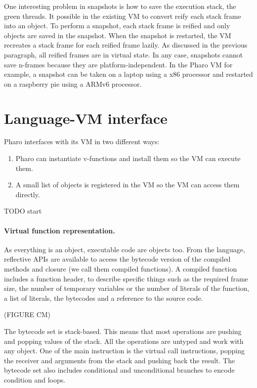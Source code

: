 \documentclass[a4paper,12pt,twoside]{../includes/ThesisStyle}
\begin{document}
One interesting problem in snapshots is how to save the execution stack, \ie the green threads. It possible in the existing VM to convert reify each stack frame into an object. To perform a snapshot, each stack frame is reified and only objects are saved in the snapshot. When the snapshot is restarted, the VM recreates a stack frame for each reified frame lazily. As discussed in the previous paragraph, all reified frames are in virtual state. In any case, snapshots cannot save n-frames because they are platform-independent. In the Pharo VM for example, a snapshot can be taken on a laptop using a x86 processor and restarted on a raspberry pie using a ARMv6 processor.


\section{Language-VM interface}

Pharo interfaces with its VM in two different ways:
\begin{enumerate}
	\item Pharo can instantiate v-functions and install them so the VM can execute them.
	\item A small list of objects is registered in the VM so the VM can access them directly.
\end{enumerate}

TODO start

\paragraph{Virtual function representation.}

As everything is an object, executable code are objects too. From the language, reflective APIs are available to access the bytecode version of the compiled methods and closure (we call them compiled functions). A compiled function includes a function header, to describe specific things such as the required frame size, the number of temporary variables or the number of literals of the function, a list of literals, the bytecodes and a reference to the source code. 

(FIGURE CM)

The bytecode set is stack-based. This means that most operations are pushing and popping values of the stack. All the operations are untyped and work with any object. One of the main instruction is the virtual call instructions, popping the receiver and arguments from the stack and pushing back the result. The bytecode set also includes conditional and unconditional branches to encode condition and loops.
\end{document}
